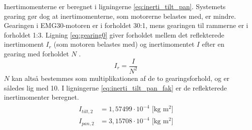 Inertimomenterne er beregnet i ligningerne \ref{eq:inerti_tilt_pan}.
Systemets gearing gør dog at inertimomenterne, som motorerne belastes med, er mindre.
Gearingen i EMG30-motoren er i forholdet 30:1, mens gearingen til rammerne er i forholdet 1:3.
Ligning \ref{eq:gearing0} giver forholdet mellem det reflekterede inertimoment \(I_r\) (som motoren belastes med)
og inertimomentet \(I\) efter en gearing med forholdet \(N\) \citep{gear_inerti}.
\begin{equation}
I_r=\frac{I}{N^2}
\label{eq:gearing0}
\end{equation}
\(N\) kan altså bestemmes som multiplikationen af de to gearingsforhold, og er således lig med 10.
I ligningerne \ref{eq:inerti_tilt_pan_fak} er de reflekterede inertimomenter beregnet.
\begin{align}
\label{eq:inerti_tilt_pan_fak}
\begin{split}
{I_{tilt,2}}&=1,57499\cdot{10}^{-4} \text{ [kg m$^2$]}
\\
{I_{pan,2}}&=3,15708\cdot{10}^{-4} \text{ [kg m$^2$]}
\end{split}
\end{align}
